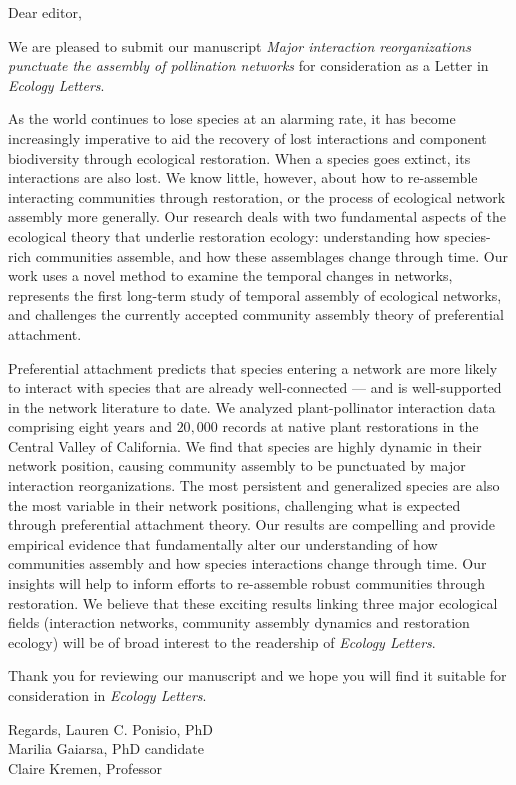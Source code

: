 \documentclass[12pt]{letter}
\begin{document}
\begin{letter}{}

  \opening{Dear editor,}

  We are pleased to submit our manuscript \textit{Major interaction
    reorganizations punctuate the assembly of pollination networks}
  for consideration as a Letter in \textit{Ecology Letters}.

  As the world continues to lose species at an alarming rate, it has
  become increasingly imperative to aid the recovery of lost
  interactions and component biodiversity through ecological
  restoration. When a species goes extinct, its interactions are also
  lost. We know little, however, about how to re-assemble interacting
  communities through restoration, or the process of ecological
  network assembly more generally. Our research deals with two
  fundamental aspects of the ecological theory that underlie
  restoration ecology: understanding how species-rich communities
  assemble, and how these assemblages change through time. Our work
  uses a novel method to examine the temporal changes in networks,
  represents the first long-term study of temporal assembly of
  ecological networks, and challenges the currently accepted community
  assembly theory of preferential attachment.

  Preferential attachment predicts that species entering a network are
  more likely to interact with species that are already well-connected
  --- and is well-supported in the network literature to date.  We
  analyzed plant-pollinator interaction data comprising eight years
  and \texttildelow $20,000$ records at native plant restorations in
  the Central Valley of California. We find that species are highly
  dynamic in their network position, causing community assembly to be
  punctuated by major interaction reorganizations. The most persistent
  and generalized species are also the most variable in their network
  positions, challenging what is expected through preferential
  attachment theory. Our results are compelling and provide empirical
  evidence that fundamentally alter our understanding of how
  communities assembly and how species interactions change through
  time. Our insights will help to inform efforts to re-assemble robust
  communities through restoration.  We believe that these exciting
  results linking three major ecological fields (interaction networks,
  community assembly dynamics and restoration ecology) will be of
  broad interest to the readership of \textit{Ecology Letters}.
 
  Thank you for reviewing our manuscript and we hope you will find it
  suitable for consideration in \textit{Ecology Letters}.
  
  Regards,
  Lauren C. Ponisio, PhD\\
  Marilia Gaiarsa, PhD candidate\\
  Claire Kremen, Professor

\end{letter}
\end{document}
